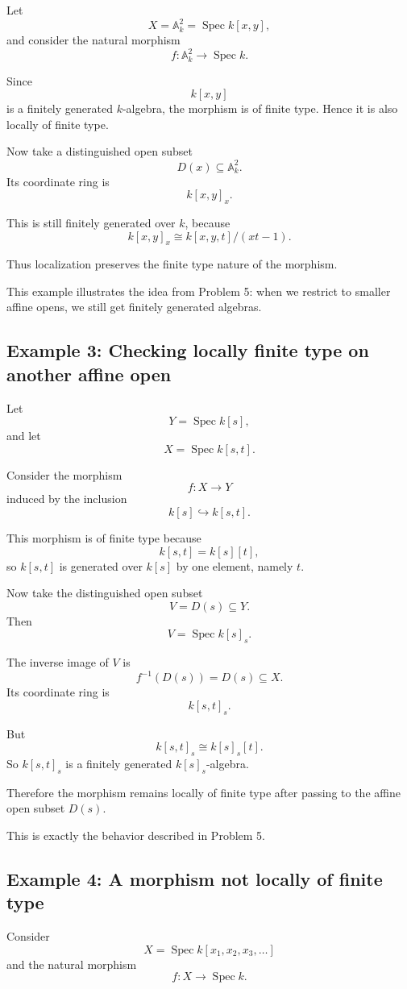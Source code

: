 \documentclass[12pt,a4paper]{article}
\theoremstyle{notespace}
\begin{document}
Let
\[
X=\mathbb A_k^2=\operatorname{Spec} k[x,y],
\]
and consider the natural morphism
\[
f:\mathbb A_k^2\to \operatorname{Spec} k.
\]

Since
\[
k[x,y]
\]
is a finitely generated \(k\)-algebra, the morphism is of finite type. Hence it is also locally of finite type.

Now take a distinguished open subset
\[
D(x)\subseteq \mathbb A_k^2.
\]
Its coordinate ring is
\[
k[x,y]_x.
\]

This is still finitely generated over \(k\), because
\[
k[x,y]_x\cong k[x,y,t]/(xt-1).
\]

Thus localization preserves the finite type nature of the morphism.

This example illustrates the idea from Problem 5: when we restrict to smaller affine opens, we still get finitely generated algebras.

\subsection{Example 3: Checking locally finite type on another affine open}

Let
\[
Y=\operatorname{Spec} k[s],
\]
and let
\[
X=\operatorname{Spec} k[s,t].
\]

Consider the morphism
\[
f:X\to Y
\]
induced by the inclusion
\[
k[s]\hookrightarrow k[s,t].
\]

This morphism is of finite type because
\[
k[s,t]=k[s][t],
\]
so \(k[s,t]\) is generated over \(k[s]\) by one element, namely \(t\).

Now take the distinguished open subset
\[
V=D(s)\subseteq Y.
\]
Then
\[
V=\operatorname{Spec} k[s]_s.
\]

The inverse image of \(V\) is
\[
f^{-1}(D(s))=D(s)\subseteq X.
\]
Its coordinate ring is
\[
k[s,t]_s.
\]

But
\[
k[s,t]_s\cong k[s]_s[t].
\]
So \(k[s,t]_s\) is a finitely generated \(k[s]_s\)-algebra.

Therefore the morphism remains locally of finite type after passing to the affine open subset \(D(s)\).

This is exactly the behavior described in Problem 5.

\subsection{Example 4: A morphism not locally of finite type}

Consider
\[
X=\operatorname{Spec} k[x_1,x_2,x_3,\dots]
\]
and the natural morphism
\[
f:X\to \operatorname{Spec} k.
\]
\end{document}
